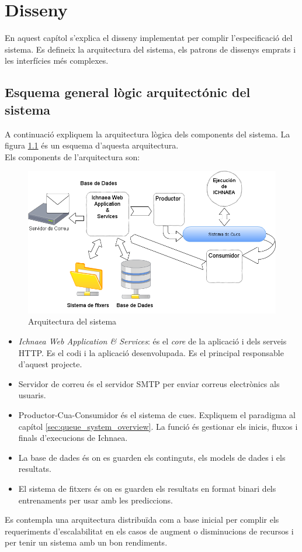 \chapter{Disseny}
\label{cha:dessign}

En aquest cap\'{i}tol s'explica el disseny implementat per complir l'especificació del sistema. Es defineix la arquitectura del sistema, els patrons de dissenys emprats i les interfícies m\'{e}s complexes. 

\section{Esquema general l\`{o}gic arquitect\'{o}nic del sistema}
A continuació expliquem la arquitectura lògica dels components del sistema. La figura \ref{fig:archsoftware} \'{e}s un esquema d'aquesta arquitectura.\\

Els components de l'arquitectura son:

\begin{figure}[h!]
  \includegraphics[scale=0.5]{img/design/ArchitectureSoftware.png}
  \caption{Arquitectura del sistema}
  \label{fig:archsoftware}
\end{figure}

\begin{itemize}
\item \textit{Ichnaea Web Application \& Services}: \'{e}s el \textit{core} de la aplicaci\'{o} i dels serveis HTTP. Es el codi i la aplicació desenvolupada. Es el principal responsable d'aquest projecte.
\item Servidor de correu \'{e}s el servidor SMTP per enviar correus electr\`{o}nics als usuaris.
\item Productor-Cua-Consumidor \'{e}s el sistema de cues. Expliquem el paradigma al cap\'{i}tol \ref{sec:queue_system_overview}. La funci\'{o} \'{e}s gestionar els inicis, fluxos i finals d'execucions de Ichnaea.
\item La base de dades \'{e}s on es guarden els continguts, els models de dades i els resultats.
\item El sistema de fitxers \'{e}s on es guarden els resultats en format binari dels entrenaments per usar amb les prediccions.
\end{itemize}
Es contempla una arquitectura distribuïda com a base inicial per complir els requeriments d'escalabilitat en els casos de augment o disminucions de recursos i per tenir un sistema amb un bon rendiments.\\

